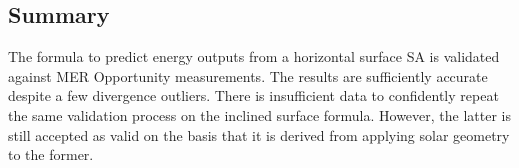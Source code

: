 

\subsection{Summary}
The formula to predict energy outputs from a horizontal surface \ac{SA} is validated against \ac{MER} Opportunity measurements. The results are sufficiently accurate despite a few divergence outliers. There is insufficient data to confidently repeat the same validation process on the inclined surface formula. However, the latter is still accepted as valid on the basis that it is derived from applying solar geometry to the former.
